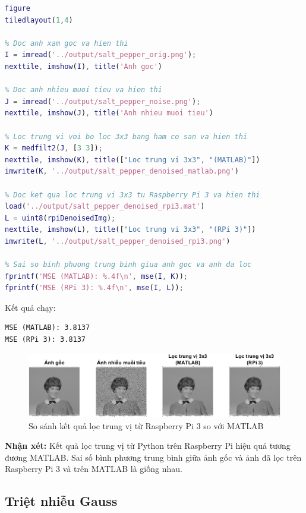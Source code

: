 \begin{lstlisting}[language=MATLAB]
figure
tiledlayout(1,4)

% Doc anh xam goc va hien thi
I = imread('../output/salt_pepper_orig.png');
nexttile, imshow(I), title('Anh goc')

% Doc anh nhieu muoi tieu va hien thi
J = imread('../output/salt_pepper_noise.png');
nexttile, imshow(J), title('Anh nhieu muoi tieu')

% Loc trung vi voi bo loc 3x3 bang ham co san va hien thi
K = medfilt2(J, [3 3]);
nexttile, imshow(K), title(["Loc trung vi 3x3", "(MATLAB)"])
imwrite(K, '../output/salt_pepper_denoised_matlab.png')

% Doc ket qua loc trung vi 3x3 tu Raspberry Pi 3 va hien thi
load('../output/salt_pepper_denoised_rpi3.mat')
L = uint8(rpiDenoisedImg);
nexttile, imshow(L), title(["Loc trung vi 3x3", "(RPi 3)"])
imwrite(L, '../output/salt_pepper_denoised_rpi3.png')

% Sai so binh phuong trung binh giua anh goc va anh da loc
fprintf('MSE (MATLAB): %.4f\n', mse(I, K));
fprintf('MSE (RPi 3): %.4f\n', mse(I, L));
\end{lstlisting}

Kết quả chạy:

\begin{lstlisting}[style=output]
MSE (MATLAB): 3.8137
MSE (RPi 3): 3.8137
\end{lstlisting}

\begin{figure}[H]
    \centering
    \includegraphics[width=1\linewidth]{images/salt_peper_compare.png}
    \caption{So sánh kết quả lọc trung vị từ Raspberry Pi 3 so với MATLAB}
\end{figure}

\textbf{Nhận xét:} Kết quả lọc trung vị từ Python trên Raspberry Pi hiệu quả tương đương MATLAB. 
Sai số bình phương trung bình giữa ảnh gốc và ảnh đã lọc trên Raspberry Pi 3 và trên MATLAB là giống nhau.

\subsection{Triệt nhiễu Gauss}

